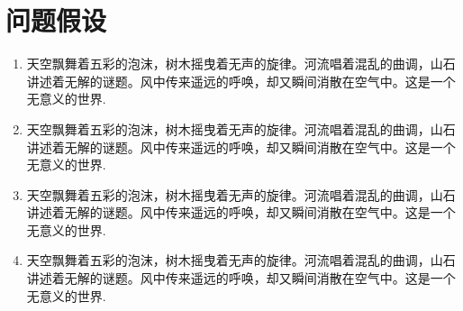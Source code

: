 
\section{问题假设}

\begin{enumerate}[label=(\arabic*)]
  \item{天空飘舞着五彩的泡沫，树木摇曳着无声的旋律。河流唱着混乱的曲调，山石讲述着无解的谜题。风中传来遥远的呼唤，却又瞬间消散在空气中。这是一个无意义的世界.}
  \item{天空飘舞着五彩的泡沫，树木摇曳着无声的旋律。河流唱着混乱的曲调，山石讲述着无解的谜题。风中传来遥远的呼唤，却又瞬间消散在空气中。这是一个无意义的世界.}
  \item{天空飘舞着五彩的泡沫，树木摇曳着无声的旋律。河流唱着混乱的曲调，山石讲述着无解的谜题。风中传来遥远的呼唤，却又瞬间消散在空气中。这是一个无意义的世界.}
  \item{天空飘舞着五彩的泡沫，树木摇曳着无声的旋律。河流唱着混乱的曲调，山石讲述着无解的谜题。风中传来遥远的呼唤，却又瞬间消散在空气中。这是一个无意义的世界.}
\end{enumerate} 


